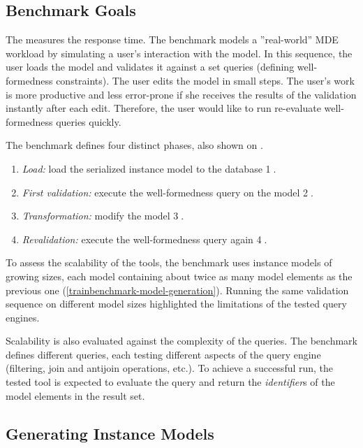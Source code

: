 \subsection{Benchmark Goals}

The \tb{} measures the response time. The benchmark models a ''real-world'' MDE workload by simulating a user's interaction with the model. In this sequence, the user loads the model and validates it against a set  queries (defining well-formedness constraints). The user edits the model in small steps. The user's work is more productive and less error-prone if she receives the results of the validation instantly after each edit. Therefore, the user would like to run re-evaluate well-formedness queries quickly.


The benchmark defines four distinct phases, also shown on .

\begin{enumerate}
  \item \emph{Load:} load the serialized instance model to the database \textcircled{1}.
  \item \emph{First validation:} execute the well-formedness query on the model \textcircled{2}.
  \item \emph{Transformation:} modify the model \textcircled{3}.
  \item \emph{Revalidation:} execute the well-formedness query again \textcircled{4}.
\end{enumerate}

To assess the scalability of the tools, the benchmark uses instance models of growing sizes, each model containing about twice as many model elements as the previous one (\autoref{trainbenchmark-model-generation}). Running the same validation sequence on different model sizes highlighted the limitations of the tested query engines.

Scalability is also evaluated against the complexity of the queries. The benchmark defines different queries, each testing different aspects of the query engine (filtering, join and antijoin operations, etc.). To achieve a successful run, the tested tool is expected to evaluate the query and return the \emph{identifier}s of the model elements in the result set.

\subsection{Generating Instance Models}
\label{trainbenchmark-model-generation}

